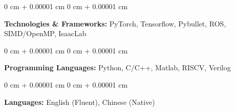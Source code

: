 \documentclass[10pt, letterpaper]{article}
\newenvironment{onecolentry}{
    \begin{adjustwidth}{
        0 cm + 0.00001 cm
    }{
        0 cm + 0.00001 cm
    }
}{
    \end{adjustwidth}
} %
\begin{document}
        \begin{onecolentry}
            \textbf{Technologies \& Frameworks:} PyTorch, Tensorflow, Pybullet, ROS, SIMD/OpenMP, IsaacLab
        \end{onecolentry}

        \vspace{0.2 cm}

        \begin{onecolentry}
            \textbf{Programming Languages:} Python, C/C++, Matlab, RISCV, Verilog
        \end{onecolentry}

        \vspace{0.2 cm}

        \begin{onecolentry}
            \textbf{Languages:} English (Fluent), Chinese (Native)
        \end{onecolentry}

    
\end{document}

